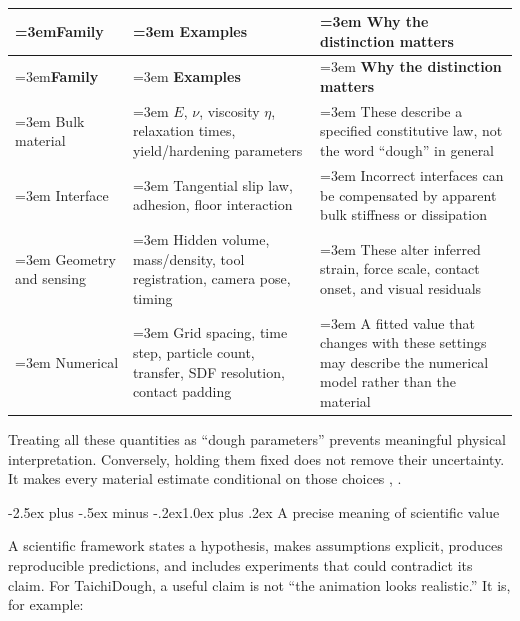 \documentclass[
  11pt,
]{article}
\makeatletter
\renewcommand\subsection{\needspace{5\baselineskip}\@startsection{subsection}{2}{\z@}%
  {-2.5ex plus -.5ex minus -.2ex}{1.0ex plus .2ex}%
  {\normalfont\sffamily\large\bfseries\color{accent}}}
\makeatother
\begin{document}
\begin{small}
\begin{longtable}{@{}>{\raggedright\sloppy\emergencystretch=3em\arraybackslash}p{} >{\raggedright\sloppy\emergencystretch=3em\arraybackslash}p{} >{\raggedright\sloppy\emergencystretch=3em\arraybackslash}p{}@{}}
\caption{}\\
\toprule
\textbf{Family} & \textbf{Examples} & \textbf{Why the distinction matters} \\
\midrule
\endfirsthead
\toprule
\textbf{Family} & \textbf{Examples} & \textbf{Why the distinction matters} \\
\midrule
\endhead
Bulk material & \(E\), \(\nu\), viscosity \(\eta\), relaxation times, yield/hardening
parameters & These describe a specified constitutive law, not the word ``dough'' in
general \\
\hline
Interface & Tangential slip law, adhesion, floor interaction & Incorrect interfaces can be compensated by apparent bulk stiffness or
dissipation \\
\hline
Geometry and sensing & Hidden volume, mass/density, tool registration, camera pose, timing & These alter inferred strain, force scale, contact onset, and visual
residuals \\
\hline
Numerical & Grid spacing, time step, particle count, transfer, SDF resolution,
contact padding & A fitted value that changes with these settings may describe the
numerical model rather than the material \\
\bottomrule
\end{longtable}
\end{small}

Treating all these quantities as ``dough parameters'' prevents
meaningful physical interpretation. Conversely, holding them fixed does
not remove their uncertainty. It makes every material estimate
conditional on those choices ,
.

\subsection{A precise meaning of scientific
value}\label{a-precise-meaning-of-scientific-value}

A scientific framework states a hypothesis, makes assumptions explicit,
produces reproducible predictions, and includes experiments that could
contradict its claim. For TaichiDough, a useful claim is not ``the
animation looks realistic.'' It is, for example:
\end{document}
